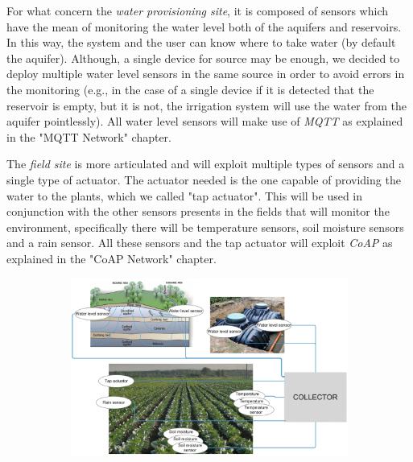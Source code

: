 For what concern the \textit{water provisioning site}, it is composed of sensors which have the mean of monitoring the water level both of the aquifers and reservoirs. In this way, the system and the user can know where to take water (by default the aquifer). Although, a single device for source may be enough, we decided to deploy multiple water level sensors in the same source in order to avoid errors in the monitoring (e.g., in the case of a single device if it is detected that the reservoir is empty, but it is not, the irrigation system will use the water from the aquifer pointlessly).
All water level sensors will make use of \textit{MQTT} as explained in the "MQTT Network" chapter.


The \textit{field site} is more articulated and will exploit multiple types of sensors and a single type of actuator. The actuator needed is the one capable of providing the water to the plants, which we called "tap actuator". This will be used in conjunction with the other sensors presents in the fields that will monitor the environment, specifically there will be temperature sensors, soil moisture sensors and a rain sensor. 
All these sensors and the tap actuator will exploit \textit{CoAP} as explained in the "CoAP Network" chapter.


\begin{figure}[H]
	\begin{subfigure}{\textwidth}
	\centering
		\includegraphics[width=1\linewidth]{img/deployment.png} 
	\end{subfigure}
\end{figure}